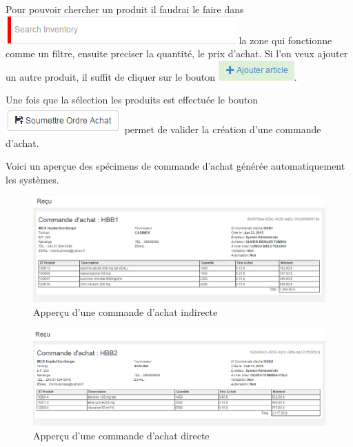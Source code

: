 \documentclass[12pt,a4paper]{report}
\begin{document}
Pour pouvoir chercher un produit il faudrai le faire dans \includegraphics[scale=0.4]{pic/SearchInventory.png} la zone qui fonctionne comme un filtre, ensuite preciser la quantité, le prix d'achat. Si l'on veux ajouter un autre produit, il suffit de cliquer sur le bouton \includegraphics[scale=0.7]{pic/AjArticleGreen.png}.

Une fois que la sélection les produits est effectuée le bouton \includegraphics[scale=0.7]{pic/SunPurchaseOrder.png} permet de valider la création d'une commande d'achat.

Voici un aperçue des spécimens de commande d'achat générée automatiquement les systèmes.

\begin{figure}[h]
\begin{center}
\includegraphics[width=12cm]{pic/OrdreAchatInvoice.png}
\end{center}
\caption{Apperçu d'une commande d'achat indirecte}
\label{Apperçu d'une commande d'achat indirecte}
\end{figure}  

\begin{figure}[h]
\begin{center}
\includegraphics[width=12cm]{pic/ComAchatDirect.png}
\end{center}
\caption{Apperçu d'une commande d'achat directe}
\label{Apperçu d'une commande d'achat directe}
\end{figure}
\end{document}
